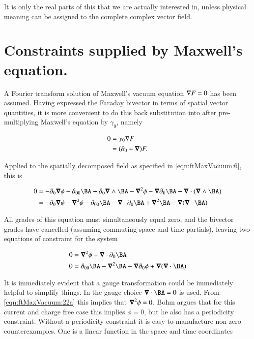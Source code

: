 It is only the real parts of this that we are actually interested in, unless physical meaning can be assigned to the complete complex vector field.

\section{Constraints supplied by Maxwell's equation.}

A Fourier transform solution of Maxwell's vacuum equation $\nabla F = 0$ has been assumed.  Having expressed the Faraday bivector in terms of spatial vector quantities, it is more convenient to do this back substitution into after pre-multiplying Maxwell's equation by $\gamma_0$, namely

\begin{align}
\label{eqn:ftMaxVacuum:20}
0
&= \gamma_0 \nabla F \\
&= (\partial_0 + \boldsymbol{\nabla}) F.
\end{align}

Applied to the spatially decomposed field as specified in \autoref{eqn:ftMaxVacuum:6}, this is

\begin{align*}
0
&=
-\partial_0 \spacegrad \phi
-\partial_{00} \BA
+ \partial_0 \spacegrad \wedge \BA
-\spacegrad^2 \phi
- \spacegrad \partial_0 \BA
+ \spacegrad \cdot (\spacegrad \wedge \BA ) \\
&=
- \partial_0 \spacegrad \phi - \spacegrad^2 \phi
- \partial_{00} \BA
- \spacegrad \cdot \partial_0 \BA
+ \spacegrad^2 \BA 
- \spacegrad (\spacegrad \cdot \BA ) \\
\end{align*}

All grades of this equation must simultaneously equal zero, and the bivector grades have cancelled (assuming commuting space and time partials), leaving two equations of constraint for the system

\begin{subequations}
\label{eqn:ftMaxVacuum:22}
\begin{align}
0 &=
\spacegrad^2 \phi + \spacegrad \cdot \partial_0 \BA
\label{eqn:ftMaxVacuum:22a}
\\
0 &=
\partial_{00} \BA - \spacegrad^2 \BA
+ \spacegrad \partial_0 \phi 
+ \spacegrad ( \spacegrad \cdot \BA )
\label{eqn:ftMaxVacuum:22b}
\end{align}
\end{subequations}

It is immediately evident that a gauge transformation could be immediately helpful to simplify things.  In \cite{bohm1989qt} the gauge choice $\spacegrad \cdot \BA = 0$ is used.  From \autoref{eqn:ftMaxVacuum:22a} this implies that $\boldsymbol{\nabla}^2 \phi = 0$.  Bohm argues that for this current and charge free case this implies $\phi = 0$, but he also has a periodicity constraint.  Without a periodicity constraint it is easy to manufacture non-zero counterexamples.  One is a linear function in the space and time coordinates

